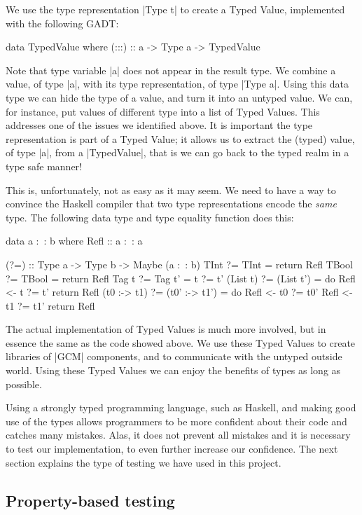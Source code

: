 \documentclass{article}
\begin{document}
We use the type representation |Type t| to create a Typed Value,
implemented with the following GADT:
%
\begin{haskellcode}
data TypedValue where
  (:::) :: a -> Type a -> TypedValue
\end{haskellcode}
%
Note that type variable |a| does not appear in the result type.
%
We combine a value, of type |a|, with its type representation, of type
|Type a|.
%
Using this data type we can hide the type of a value, and turn it into
an untyped value.
%
We can, for instance, put values of different type into a list of
Typed Values.
%
This addresses one of the issues we identified above.
%
It is important the type representation is part of a Typed Value;
%
it allows us to extract the (typed) value, of type |a|, from a
|TypedValue|, that is we can go back to the typed realm in a type safe
manner!

This is, unfortunately, not as easy as it may seem.
%
We need to have a way to convince the Haskell compiler that two type
representations encode the \emph{same} type.
%
The following data type and type equality function does this:
%
\begin{haskellcode}
data a :~: b where
  Refl :: a :~: a

(?=) :: Type a -> Type b -> Maybe (a :~: b)
TInt         ?= TInt       = return Refl
TBool        ?= TBool      = return Refl
Tag t        ?= Tag t'     = t ?= t'
(List t)     ?= (List t')  = do
  Refl <- t  ?= t'
  return Refl
(t0 :-> t1)  ?= (t0' :-> t1') = do
  Refl <- t0 ?= t0'
  Refl <- t1 ?= t1'
  return Refl
\end{haskellcode}
%
The actual implementation of Typed Values is much more involved, but
in essence the same as the code showed above.
%
We use these Typed Values to create libraries of |GCM| components, and
to communicate with the untyped outside world.
%
Using these Typed Values we can enjoy the benefits of types as long as
possible.

Using a strongly typed programming language, such as Haskell, and
making good use of the types allows programmers to be more confident
about their code and catches many mistakes.
%
Alas, it does not prevent all mistakes and it is necessary to test our
implementation, to even further increase our confidence.
%
The next section explains the type of testing we have used in this
project.

\subsection{Property-based testing}
\end{document}
